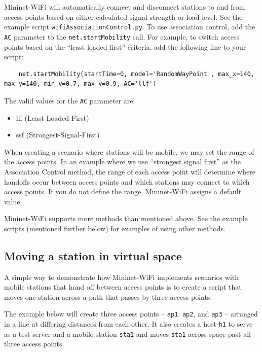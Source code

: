 Mininet-WiFi will automatically connect and disconnect stations to and from access points based on either calculated signal strength or load level. See the example script \texttt{wifiAssociationControl.py}. To use association control, add the \texttt{AC} parameter to the \texttt{net.startMobility} call. For example, to switch access points based on the “least loaded first” criteria, add the following line to your script:

\begin{verbatim}
    net.startMobility(startTime=0, model='RandomWayPoint', max_x=140, max_y=140, min_v=0.7, max_v=0.9, AC='llf')
\end{verbatim}

The valid values for the \texttt{AC} parameter are:

\begin{itemize}
\item llf (Least-Loaded-First)
\item ssf (Strongest-Signal-First)\\
\end{itemize}

When creating a scenario where stations will be mobile, we may set the range of the access points. In an example where we use “strongest signal first” as the Association Control method, the range of each access point will determine where handoffs occur between access points and which stations may connect to which access points. If you do not define the range, Mininet-WiFi assigns a default value. 

Mininet-WiFi supports more methods than mentioned above. See the example scripts (mentioned further below) for examples of using other methods.


\subsection{Moving a station in virtual space}

A simple way to demonstrate how Mininet-WiFi implements scenarios with mobile stations that hand off between access points is to create a script that moves one station across a path that passes by three access points.

The example below will create three access points -- \texttt{ap1}, \texttt{ap2}, and \texttt{ap3} -- arranged in a line at differing distances from each other. It also creates a host \texttt{h1} to serve as a test server and a mobile station \texttt{sta1} and moves \texttt{sta1} across space past all three access points.

